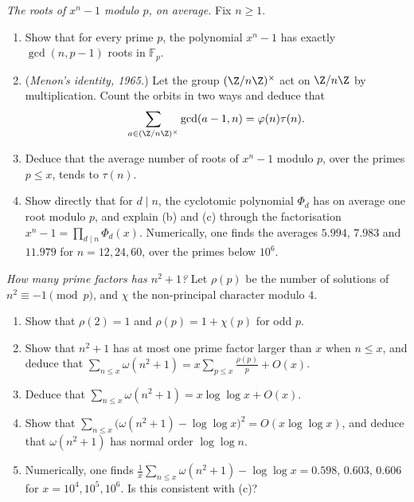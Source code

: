 \begin{exercise}[$\star\star$]\label{pb:menon}
\emph{The roots of $x^n-1$ modulo $p$, on average.} Fix $n\ge1$.
\begin{enumerate}[label=(\alph*)]
\item Show that for every prime $p$, the polynomial $x^n-1$ has exactly $\gcd(n,p-1)$ roots in $\mathbb F_p$.
\item (\emph{Menon's identity, 1965.}) Let the group $(\Z/n\Z)^\times$ act on $\Z/n\Z$ by multiplication. Count the orbits in two ways and deduce that
\[
\sum_{a\in(\Z/n\Z)^\times}\gcd(a-1,n)=\varphi(n)\tau(n).
\]
\item Deduce that the average number of roots of $x^n-1$ modulo $p$, over the primes $p\le x$, tends to $\tau(n)$.
\item Show directly that for $d\mid n$, the cyclotomic polynomial $\Phi_d$ has on average one root modulo $p$, and explain (b) and (c) through the factorisation
$x^n-1=\prod_{d\mid n}\Phi_d(x)$. Numerically, one finds the averages $5.994$, $7.983$ and $11.979$ for $n=12,24,60$, over the primes below $10^6$.
\end{enumerate}
\end{exercise}

\begin{exercise}[$\star\star\star$]\label{pb:omegapoly}
\emph{How many prime factors has $n^2+1$?} Let $\rho(p)$ be the number of solutions of $n^2\equiv-1\pmod p$, and $\chi$ the non-principal character modulo $4$.
\begin{enumerate}[label=(\alph*)]
\item Show that $\rho(2)=1$ and $\rho(p)=1+\chi(p)$ for odd $p$.
\item Show that $n^2+1$ has at most one prime factor larger than $x$ when $n\le x$, and deduce that $\sum_{n\le x}\omega(n^2+1)=x\sum_{p\le x}\frac{\rho(p)}p+O(x)$.
\item Deduce that $\sum_{n\le x}\omega(n^2+1)=x\log\log x+O(x)$.
\item Show that $\sum_{n\le x}\bigl(\omega(n^2+1)-\log\log x\bigr)^2=O(x\log\log x)$, and deduce that $\omega(n^2+1)$ has normal order $\log\log n$.
\item Numerically, one finds $\frac1x\sum_{n\le x}\omega(n^2+1)-\log\log x=0.598$, $0.603$, $0.606$ for $x=10^4,10^5,10^6$. Is this consistent with (c)?
\end{enumerate}
\end{exercise}

